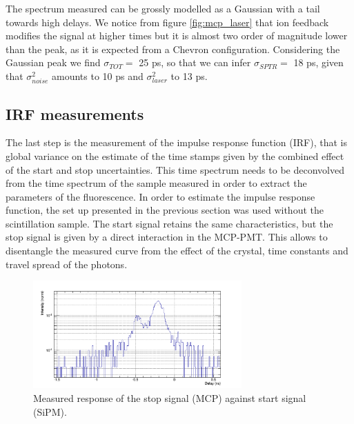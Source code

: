 The spectrum measured can be grossly modelled as a Gaussian with a tail towards high delays. 
We notice from figure \ref{fig:mcp_laser} that ion feedback modifies the signal at higher times but it is almost two order of magnitude lower than the peak, as it is expected from a Chevron configuration. Considering the Gaussian peak we find $\sigma _{TOT} =$ 25 ps, so that we can infer    $\sigma _{SPTR} = $ 18 ps, given that $\sigma _{noise}^{2}$ amounts to 10 ps and $\sigma _{laser}^{2}$ to 13 ps.

\subsection{IRF measurements}
The last step is the measurement of the impulse response function (IRF), that is global variance on the estimate of the time stamps given by the combined effect of the start and stop uncertainties. This time spectrum needs to be deconvolved from the time spectrum of the sample measured in order to extract the parameters of the fluorescence.
In order to estimate the impulse response function, the set up presented in the previous section was used without the scintillation sample. The start signal retains the same characteristics, but the stop signal is given by a direct interaction in the MCP-PMT. This allows to disentangle the measured curve from the effect of the crystal, time constants and travel spread of the photons.
\begin{figure}[htbp]
\begin{center}
\includegraphics[width=8cm]{../Pictures/Chapter_8/response_cer_10}
\end{center}
\caption[Corrected IRF]{Measured response of the stop signal (MCP) against start signal (SiPM).}
\label{fig:ceren_10}
\end{figure}

